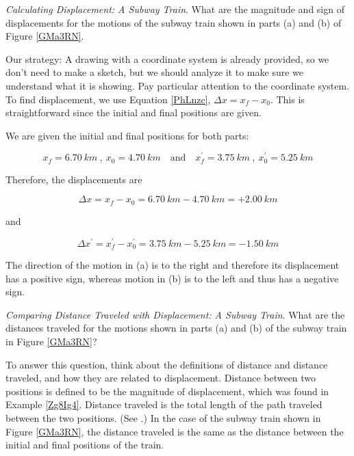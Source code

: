 \documentclass[../../main-ap-physics.tex]{subfiles}
\begin{document}
\begin{example} \label{Zg8Ig4}
    \textit{Calculating Displacement: A Subway Train}. What are the magnitude and sign of displacements for the motions of the subway train shown in parts (a) and (b) of Figure \ref{GMa3RN}.
\end{example}

\Solution Our strategy: A drawing with a coordinate system is already provided, so we don't need to make a sketch, but we should analyze it to make sure we understand what it is showing. Pay particular attention to the coordinate system. To find displacement, we use Equation \eqref{PhLnzc}, $\Delta{x} = x_f - x_0$. This is straightforward since the initial and final positions are given.

\vspace{1em}

We are given the initial and final positions for both parts:

\begin{equation*}
    x_f = \SI{6.70}{km}\ ,\ x_0=\SI{4.70}{km} \quad
    \text{and} \quad
    x_f^{\prime}=\SI{3.75}{km}\ ,\ x_0^{\prime} = \SI{5.25}{km}
\end{equation*}

Therefore, the displacements are

\begin{equation*}
    \Delta x = x_f - x_0 = \SI{6.70}{km} - \SI{4.70}{km} = +\SI{2.00}{km}
\end{equation*}

and

\begin{equation*}
    \Delta x^{\prime} = x_f^{\prime} - x_0^{\prime} = \SI{3.75}{km} - \SI{5.25}{km} = -\SI{1.50}{km}
\end{equation*}

The direction of the motion in (a) is to the right and therefore its displacement has a positive sign, whereas motion in (b) is to the left and thus has a negative sign.

\endsolution

\begin{example}
    \textit{Comparing Distance Traveled with Displacement: A Subway Train}. What are the distances traveled for the motions shown in parts (a) and (b) of the subway train in Figure \ref{GMa3RN}?
\end{example}

\Solution To answer this question, think about the definitions of distance and distance traveled, and how they are related to displacement. Distance between two positions is defined to be the magnitude of displacement, which was found in Example \ref{Zg8Ig4}. Distance traveled is the total length of the path traveled between the two positions. (See .) In the case of the subway train shown in Figure \ref{GMa3RN}, the distance traveled is the same as the distance between the initial and final positions of the train.
\end{document}
